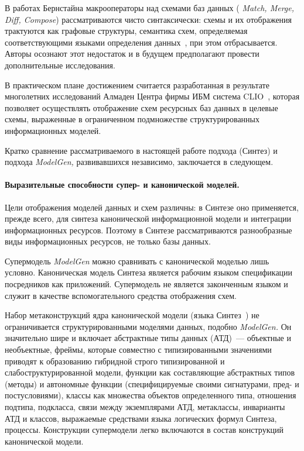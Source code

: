 \begin{multicols}{2}
В работах Бернстайна макрооператоры над схемами баз данных ({\em
Match, Merge, Diff, Compose}) рассматриваются чисто синтаксически:
схемы и их отображения трактуются как графовые структуры, семантика
схем, определяемая соответствующими языками определения данных~\cite{Be03},
при этом отбрасывается. Авторы осознают этот недостаток и в будущем
предполагают провести дополнительные исследования.

В практическом плане достижением считается разработанная в результате
многолетних исследований Алмаден Центра фирмы ИБМ система CLIO~\cite{Ha05},
которая позволяет осуществлять отоб\-ра\-же\-ние схем ресурсных баз
данных в целевые схемы, выраженные в ограниченном подмножестве
структурированных информационных моделей.

Кратко сравнение рассматриваемого в настоящей работе подхода (Синтез)
и подхода {\em ModelGen,} развивавшихся независимо, заключается в
сле\-ду\-ющем.

\paragraph*{Выразительные способности супер- и канонической моделей.}Цели
отображения моделей данных и схем различны: в Синтезе оно применяется,
прежде всего, для синтеза канонической информационной модели и
интеграции информационных ресурсов. Поэтому в Синтезе рассматриваются
разнообразные виды информационных ресурсов, не только базы данных.

Супермодель {\em ModelGen} можно сравнивать с канонической моделью
лишь условно. Каноническая модель Синтеза является рабочим языком
спецификации посредников как приложений. Супермодель не является
законченным языком и служит в качестве вспомогательного средства
отоб\-ра\-же\-ния схем. 

Набор метаконструкций ядра канонической модели
(языка Синтез~\cite{Sy07}) не ограничивается структурированными моделями данных,
подобно {\em ModelGen.} Он значительно шире и включает абстрактные
типы данных (АТД)~--- объектные и необъектные, фреймы, которые совместно с
типизированными значениями приводят к образованию гибридной строго
типизированной и слабоструктурированной модели, функции как
составляющие абстрактных типов (методы) и автономные функции
(специфицируемые своими сигнатурами, пред- и постусловиями), классы как
множества объектов определенного типа, отношения подтипа, подкласса,
связи между экземплярами АТД, метаклассы, инварианты АТД и классов,
выражаемые средствами языка логических формул Синтеза, процессы.
Конструкции супермодели легко включаются в состав конструкций
канонической модели.


\end{multicols}
